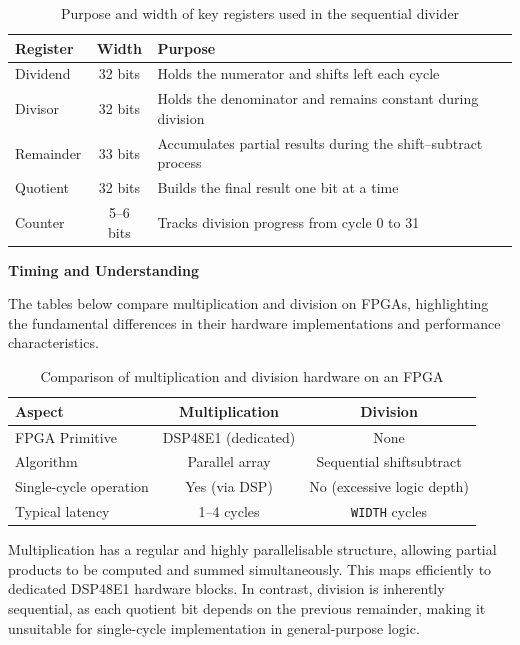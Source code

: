 \documentclass[a4paper,12pt]{article}
\begin{document}
\begin{table}[h]
\centering
\begin{tabular}{l c l}
\hline
\textbf{Register} & \textbf{Width} & \textbf{Purpose} \\
\hline
Dividend  & 32 bits & Holds the numerator and shifts left each cycle \\
Divisor   & 32 bits & Holds the denominator and remains constant during division \\
Remainder & 33 bits & Accumulates partial results during the shift--subtract process \\
Quotient  & 32 bits & Builds the final result one bit at a time \\
Counter   & 5--6 bits & Tracks division progress from cycle 0 to 31 \\
\hline
\end{tabular}
\caption{Purpose and width of key registers used in the sequential divider}
\end{table}

\textbf{Timing and Understanding}

The tables below compare multiplication and division on FPGAs, highlighting the fundamental differences in their hardware implementations and performance characteristics.

\begin{table}[h]
\centering
\begin{tabular}{l c c}
\hline
\textbf{Aspect} & \textbf{Multiplication} & \textbf{Division} \\
\hline
FPGA Primitive & DSP48E1 (dedicated) & None \\
Algorithm & Parallel array & Sequential shift\-subtract \\
Single-cycle operation & Yes (via DSP) & No (excessive logic depth) \\
Typical latency & 1--4 cycles & \texttt{WIDTH} cycles \\
\hline
\end{tabular}
\caption{Comparison of multiplication and division hardware on an FPGA}
\end{table}

Multiplication has a regular and highly parallelisable structure, allowing partial products to be computed and summed simultaneously. This maps efficiently to dedicated DSP48E1 hardware blocks. In contrast, division is inherently sequential, as each quotient bit depends on the previous remainder, making it unsuitable for single-cycle implementation in general-purpose logic.
\end{document}
